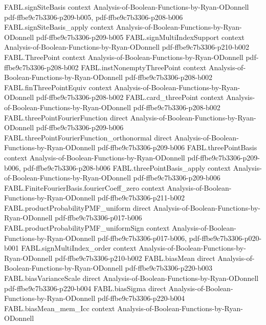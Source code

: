 \begin{theorem}
\proofstep
  {FABL.signSiteBasis}
  {context}
  {Analysis-of-Boolean-Functions-by-Ryan-ODonnell}
  {pdf-ffbe9c7b3306-p209-b005,
    pdf-ffbe9c7b3306-p208-b006}
\proofstep
  {FABL.signSiteBasis_apply}
  {context}
  {Analysis-of-Boolean-Functions-by-Ryan-ODonnell}
  {pdf-ffbe9c7b3306-p209-b005}
\proofstep
  {FABL.signMultiIndexSupport}
  {context}
  {Analysis-of-Boolean-Functions-by-Ryan-ODonnell}
  {pdf-ffbe9c7b3306-p210-b002}
\proofstep
  {FABL.ThreePoint}
  {context}
  {Analysis-of-Boolean-Functions-by-Ryan-ODonnell}
  {pdf-ffbe9c7b3306-p208-b002}
\proofstep
  {FABL.instNonemptyThreePoint}
  {context}
  {Analysis-of-Boolean-Functions-by-Ryan-ODonnell}
  {pdf-ffbe9c7b3306-p208-b002}
\proofstep
  {FABL.finThreePointEquiv}
  {context}
  {Analysis-of-Boolean-Functions-by-Ryan-ODonnell}
  {pdf-ffbe9c7b3306-p208-b002}
\proofstep
  {FABL.card_threePoint}
  {context}
  {Analysis-of-Boolean-Functions-by-Ryan-ODonnell}
  {pdf-ffbe9c7b3306-p208-b002}
\proofstep
  {FABL.threePointFourierFunction}
  {direct}
  {Analysis-of-Boolean-Functions-by-Ryan-ODonnell}
  {pdf-ffbe9c7b3306-p209-b006}
\proofstep
  {FABL.threePointFourierFunction_orthonormal}
  {direct}
  {Analysis-of-Boolean-Functions-by-Ryan-ODonnell}
  {pdf-ffbe9c7b3306-p209-b006}
\proofstep
  {FABL.threePointBasis}
  {context}
  {Analysis-of-Boolean-Functions-by-Ryan-ODonnell}
  {pdf-ffbe9c7b3306-p209-b006,
    pdf-ffbe9c7b3306-p208-b006}
\proofstep
  {FABL.threePointBasis_apply}
  {context}
  {Analysis-of-Boolean-Functions-by-Ryan-ODonnell}
  {pdf-ffbe9c7b3306-p209-b006}
\proofstep
  {FABL.FiniteFourierBasis.fourierCoeff_zero}
  {context}
  {Analysis-of-Boolean-Functions-by-Ryan-ODonnell}
  {pdf-ffbe9c7b3306-p211-b002}
\proofstep
  {FABL.productProbabilityPMF_uniform}
  {direct}
  {Analysis-of-Boolean-Functions-by-Ryan-ODonnell}
  {pdf-ffbe9c7b3306-p017-b006}
\proofstep
  {FABL.productProbabilityPMF_uniformSign}
  {context}
  {Analysis-of-Boolean-Functions-by-Ryan-ODonnell}
  {pdf-ffbe9c7b3306-p017-b006,
    pdf-ffbe9c7b3306-p020-b001}
\proofstep
  {FABL.signMultiIndex_order}
  {context}
  {Analysis-of-Boolean-Functions-by-Ryan-ODonnell}
  {pdf-ffbe9c7b3306-p210-b002}
\proofstep
  {FABL.biasMean}
  {direct}
  {Analysis-of-Boolean-Functions-by-Ryan-ODonnell}
  {pdf-ffbe9c7b3306-p220-b003}
\proofstep
  {FABL.biasVarianceScale}
  {direct}
  {Analysis-of-Boolean-Functions-by-Ryan-ODonnell}
  {pdf-ffbe9c7b3306-p220-b004}
\proofstep
  {FABL.biasSigma}
  {direct}
  {Analysis-of-Boolean-Functions-by-Ryan-ODonnell}
  {pdf-ffbe9c7b3306-p220-b004}
\proofstep
  {FABL.biasMean_mem_Icc}
  {context}
  {Analysis-of-Boolean-Functions-by-Ryan-ODonnell}

\end{theorem}
